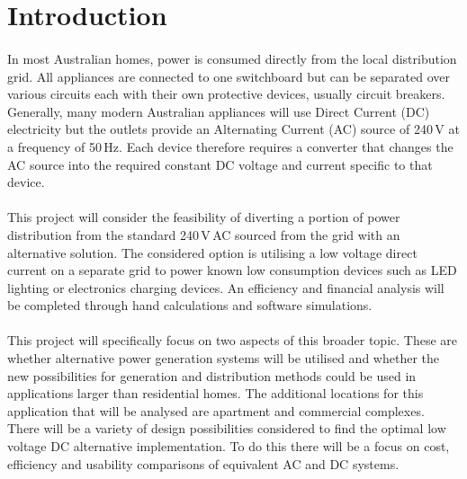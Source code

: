 
\section{Introduction}

\paragraph{} 
In most Australian homes, power is consumed directly from the local distribution grid. All appliances are connected to one switchboard but can be separated over various circuits each with their own protective devices, usually circuit breakers. Generally, many modern Australian appliances will use Direct Current (DC) electricity but the outlets provide an Alternating Current (AC) source of 240\,V at a frequency of 50\,Hz. Each device therefore requires a converter that changes the AC source into the required constant DC voltage and current specific to that device. 

\paragraph{} 
This project will consider the feasibility of diverting a portion of power distribution from the standard 240\,V\,AC sourced from the grid with an alternative solution. The considered option is utilising a low voltage direct current on a separate grid to power known low consumption devices such as LED lighting or electronics charging devices. An efficiency and financial analysis will be completed through hand calculations and software simulations.  

\paragraph{} 
This project will specifically focus on two aspects of this broader topic. These are whether alternative power generation systems will be utilised and whether the new possibilities for generation and distribution methods could be used in applications larger than residential homes. The additional locations for this application that will be analysed are apartment and commercial complexes. There will be a variety of design possibilities considered to find the optimal low voltage DC alternative implementation. To do this there will be a focus on cost, efficiency and usability comparisons of equivalent AC and DC systems.   

\newpage